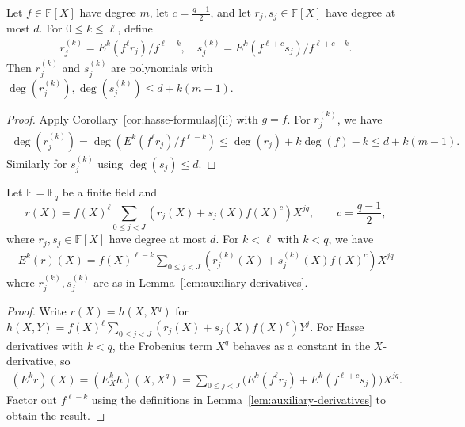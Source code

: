 \begin{lemma}\label{lem:auxiliary-derivatives} \leanok {}
  Let $f \in \mathbb{F}[X]$ have degree $m$, let $c = \frac{q-1}{2}$, and let $r_j, s_j \in \mathbb{F}[X]$ have degree at most $d$. For $0 \leq k \leq \ell$, define
  \begin{align*}
    r_j^{(k)} = E^k(f^\ell r_j)/f^{\ell-k}, \quad s_j^{(k)} = E^k(f^{\ell+c} s_j)/f^{\ell+c-k}.
  \end{align*}
  Then $r_j^{(k)}$ and $s_j^{(k)}$ are polynomials with $\deg(r_j^{(k)}), \deg(s_j^{(k)}) \leq d + k(m-1)$.
\end{lemma}
\begin{proof} \leanok
  Apply Corollary~\ref{cor:hasse-formulas}(ii) with $g = f$. For $r_j^{(k)}$, we have
  \begin{align*}
    \deg(r_j^{(k)}) = \deg(E^k(f^\ell r_j)/f^{\ell-k}) \leq \deg(r_j) + k\deg(f) - k \leq d + k(m-1).
  \end{align*}
  Similarly for $s_j^{(k)}$ using $\deg(s_j) \leq d$.
\end{proof}

\begin{lemma}\label{lem:stepanov-form} \leanok {}
  Let $\mathbb{F} = \mathbb{F}_q$ be a finite field and
  \[
    r(X) = f(X)^\ell \sum_{0 \leq j < J} (r_j(X) + s_j(X) f(X)^c) X^{jq},
    \qquad c = \frac{q-1}{2},
  \]
  where $r_j, s_j \in \mathbb{F}[X]$ have degree at most $d$. For $k < \ell$ with $k < q$, we have
  \begin{align*}
    E^k(r)(X) = f(X)^{\ell-k} \sum_{0 \leq j < J} (r_j^{(k)}(X) + s_j^{(k)}(X) f(X)^c) X^{jq}
  \end{align*}
  where $r_j^{(k)}, s_j^{(k)}$ are as in Lemma~\ref{lem:auxiliary-derivatives}.
\end{lemma}
\begin{proof} \leanok
  Write $r(X) = h(X, X^q)$ for $h(X,Y) = f(X)^\ell \sum_{0 \leq j < J} (r_j(X) + s_j(X) f(X)^c) Y^j$. For Hasse derivatives with $k < q$, the Frobenius term $X^q$ behaves as a constant in the $X$-derivative, so
  \begin{align*}
    (E^k r)(X) = (E_X^k h)(X, X^q) = \sum_{0 \leq j < J} \big(E^k(f^\ell r_j) + E^k(f^{\ell+c} s_j)\big) X^{jq}.
  \end{align*}
  Factor out $f^{\ell-k}$ using the definitions in Lemma~\ref{lem:auxiliary-derivatives} to obtain the result.
\end{proof}

